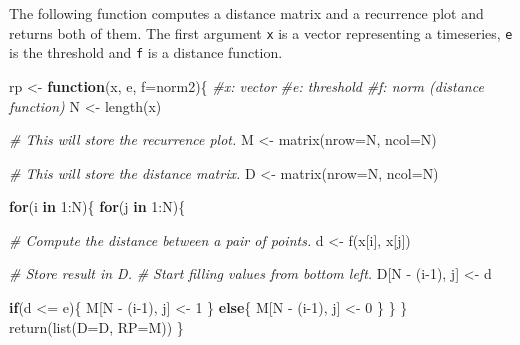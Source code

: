 \documentclass[
  11pt,
]{krantz}
\newenvironment{Shaded}{\begin{snugshade}}{\end{snugshade}}
\newcommand{\AttributeTok}[1]{\textcolor[rgb]{0.61,0.61,0.61}{#1}}
\newcommand{\CommentTok}[1]{\textcolor[rgb]{0.37,0.37,0.37}{\textit{#1}}}
\newcommand{\ControlFlowTok}[1]{\textcolor[rgb]{0.27,0.27,0.27}{\textbf{#1}}}
\newcommand{\DecValTok}[1]{\textcolor[rgb]{0.06,0.06,0.06}{#1}}
\newcommand{\FunctionTok}[1]{\textcolor[rgb]{0,0,0}{#1}}
\newcommand{\NormalTok}[1]{#1}
\newcommand{\OtherTok}[1]{\textcolor[rgb]{0.37,0.37,0.37}{#1}}
\newcommand{\SpecialCharTok}[1]{\textcolor[rgb]{0,0,0}{#1}}
\begin{document}
The following function computes a distance matrix and a recurrence plot and returns both of them. The first argument \texttt{x} is a vector representing a timeseries, \texttt{e} is the threshold and \texttt{f} is a distance function.

\begin{Shaded}
\begin{Highlighting}[]
\NormalTok{rp }\OtherTok{\textless{}{-}} \ControlFlowTok{function}\NormalTok{(x, e, }\AttributeTok{f=}\NormalTok{norm2)\{}
  \CommentTok{\#x: vector}
  \CommentTok{\#e: threshold}
  \CommentTok{\#f: norm (distance function)}
\NormalTok{  N }\OtherTok{\textless{}{-}} \FunctionTok{length}\NormalTok{(x)}
  
  \CommentTok{\# This will store the recurrence plot.}
\NormalTok{  M }\OtherTok{\textless{}{-}} \FunctionTok{matrix}\NormalTok{(}\AttributeTok{nrow=}\NormalTok{N, }\AttributeTok{ncol=}\NormalTok{N)}
  
  \CommentTok{\# This will store the distance matrix.}
\NormalTok{  D }\OtherTok{\textless{}{-}} \FunctionTok{matrix}\NormalTok{(}\AttributeTok{nrow=}\NormalTok{N, }\AttributeTok{ncol=}\NormalTok{N)}
  
  \ControlFlowTok{for}\NormalTok{(i }\ControlFlowTok{in} \DecValTok{1}\SpecialCharTok{:}\NormalTok{N)\{}
    \ControlFlowTok{for}\NormalTok{(j }\ControlFlowTok{in} \DecValTok{1}\SpecialCharTok{:}\NormalTok{N)\{}
      
      \CommentTok{\# Compute the distance between a pair of points.}
\NormalTok{      d }\OtherTok{\textless{}{-}} \FunctionTok{f}\NormalTok{(x[i], x[j])}
      
      \CommentTok{\# Store result in D.}
      \CommentTok{\# Start filling values from bottom left.}
\NormalTok{      D[N }\SpecialCharTok{{-}}\NormalTok{ (i}\DecValTok{{-}1}\NormalTok{), j] }\OtherTok{\textless{}{-}}\NormalTok{ d }
      
      \ControlFlowTok{if}\NormalTok{(d }\SpecialCharTok{\textless{}=}\NormalTok{ e)\{}
\NormalTok{        M[N }\SpecialCharTok{{-}}\NormalTok{ (i}\DecValTok{{-}1}\NormalTok{), j] }\OtherTok{\textless{}{-}} \DecValTok{1}
\NormalTok{      \}}
      \ControlFlowTok{else}\NormalTok{\{}
\NormalTok{        M[N }\SpecialCharTok{{-}}\NormalTok{ (i}\DecValTok{{-}1}\NormalTok{), j] }\OtherTok{\textless{}{-}} \DecValTok{0}
\NormalTok{      \}}
\NormalTok{    \}}
\NormalTok{  \}}
  \FunctionTok{return}\NormalTok{(}\FunctionTok{list}\NormalTok{(}\AttributeTok{D=}\NormalTok{D, }\AttributeTok{RP=}\NormalTok{M))}
\NormalTok{\}}
\end{Highlighting}
\end{Shaded}
\end{document}
